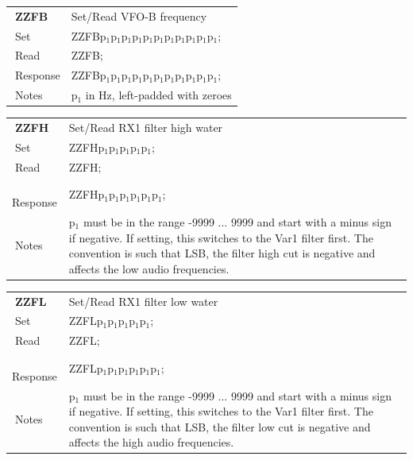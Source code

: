 \documentclass[12pt]{book}
\begin{document}
\begin{center}
\begin{tabular}{|p{2cm}|p{11cm}|}
\toprule
$\phantom{\Big|}$\textbf{\large ZZFB} & Set/Read VFO-B frequency \\\cline{1-2}
$\phantom{\Big|}${\large Set} & {ZZFBp$_1$p$_1$p$_1$p$_1$p$_1$p$_1$p$_1$p$_1$p$_1$p$_1$p$_1$;} \\\hline
$\phantom{\Big|}${\large Read} & {ZZFB;} \\\hline
$\phantom{\Big|}${\large Response} & {ZZFBp$_1$p$_1$p$_1$p$_1$p$_1$p$_1$p$_1$p$_1$p$_1$p$_1$p$_1$;} \\\hline
$\phantom{\Big|}${\large Notes} & \multicolumn{1}{|p{11cm}|}{p$_1$ in Hz, left-padded with zeroes} \\
\bottomrule
\end{tabular}
\end{center}

\begin{center}
\begin{tabular}{|p{2cm}|p{11cm}|}
\toprule
$\phantom{\Big|}$\textbf{\large ZZFH} & Set/Read RX1 filter high water \\\cline{1-2}
$\phantom{\Big|}${\large Set} & {ZZFHp$_1$p$_1$p$_1$p$_1$p$_1$;} \\\hline
$\phantom{\Big|}${\large Read} & {ZZFH;} \\\hline
$\phantom{\Big|}${\large Response} & {ZZFHp$_1$p$_1$p$_1$p$_1$p$_1$p$_1$;} \\\hline
$\phantom{\Big|}${\large Notes} & \multicolumn{1}{|p{11cm}|}{p$_1$ must be in the range -9999 ... 9999 and start with a minus sign if negative. If setting, this switches to the Var1 filter first. The convention is such that LSB, the filter high cut is negative and affects the low audio frequencies.} \\
\bottomrule
\end{tabular}
\end{center}

\begin{center}
\begin{tabular}{|p{2cm}|p{11cm}|}
\toprule
$\phantom{\Big|}$\textbf{\large ZZFL} & Set/Read RX1 filter low water \\\cline{1-2}
$\phantom{\Big|}${\large Set} & {ZZFLp$_1$p$_1$p$_1$p$_1$p$_1$;} \\\hline
$\phantom{\Big|}${\large Read} & {ZZFL;} \\\hline
$\phantom{\Big|}${\large Response} & {ZZFLp$_1$p$_1$p$_1$p$_1$p$_1$p$_1$;} \\\hline
$\phantom{\Big|}${\large Notes} & \multicolumn{1}{|p{11cm}|}{p$_1$ must be in the range -9999 ... 9999 and start with a minus sign if negative. If setting, this switches to the Var1 filter first. The convention is such that LSB, the filter low cut is negative and affects the high audio frequencies.} \\
\bottomrule
\end{tabular}
\end{center}
\end{document}
